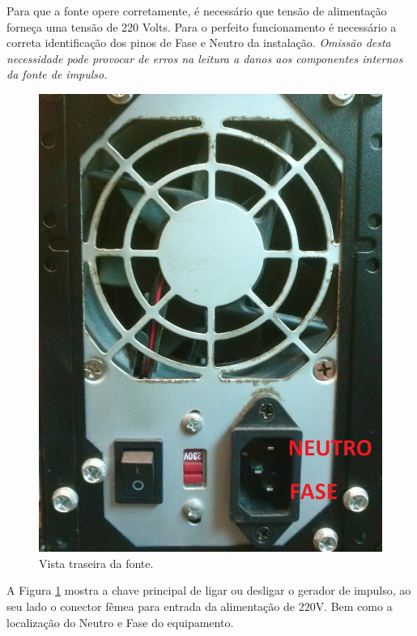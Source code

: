 \documentclass[a4paper, 10pt]{article}
\begin{document}

Para que a fonte opere corretamente, é necessário que tensão de alimentação 
forneça uma tensão de 220 Volts. Para o perfeito funcionamento é necessário a correta 
identificação dos pinos de Fase e Neutro da instalação. \textit{Omissão desta necessidade 
pode provocar de erros na leitura a danos aos componentes internos da fonte de impulso.}

\begin{figure}[!h]
        \caption{\label{fig_vista_traseira_fonte} Vista traseira da fonte.}
	    \begin{center}
            \includegraphics[scale=0.08]{../fotos/fonte_alimentacao.jpg}
	    \end{center}
\end{figure}
A Figura \ref{fig_vista_traseira_fonte} mostra a chave principal de ligar ou 
desligar o gerador de impulso, ao seu lado o conector fêmea para entrada da alimentação de 220V.
Bem como a localização do Neutro e Fase do equipamento. 
\end{document}
